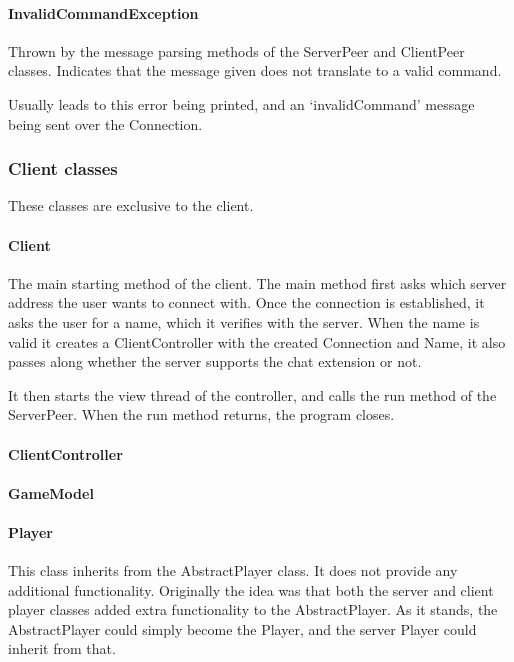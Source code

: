\documentclass[12pt, letterpaper]{article}
\begin{document}
    \paragraph{InvalidCommandException}
    Thrown by the message parsing methods of the ServerPeer and ClientPeer classes.
    Indicates that the message given does not translate to a valid command.

    Usually leads to this error being printed, and an `invalidCommand' message being sent over the Connection.



    \subsubsection{Client classes}

    These classes are exclusive to the client.

    \paragraph{Client}
    The main starting method of the client.
    The main method first asks which server address the user wants to connect with.
    Once the connection is established, it asks the user for a name, which it verifies with the server.
    When the name is valid it creates a ClientController with the created Connection and Name, it also passes along
    whether the server supports the chat extension or not.

    It then starts the view thread of the controller, and calls the run method of the ServerPeer.
    When the run method returns, the program closes.

    \paragraph{ClientController}


    \paragraph{GameModel}

    \paragraph{Player}
    This class inherits from the AbstractPlayer class.
    It does not provide any additional functionality.
    Originally the idea was that both the server and client player classes added extra functionality to the
    AbstractPlayer.
    As it stands, the AbstractPlayer could simply become the Player, and the server Player could inherit from that.
\end{document}
